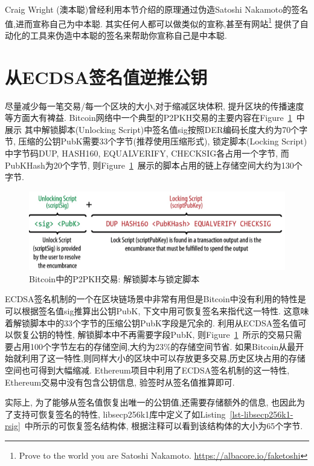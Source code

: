 \documentclass{article}
\begin{document}
Craig Wright (澳本聪)曾经利用本节介绍的原理通过伪造Satoshi Nakamoto的签名值,进而宣称自己为中本聪.
其实任何人都可以做类似的宣称,甚至有网站\footnote{
Prove to the world you are Satoshi Nakamoto. \url{https://albacore.io/faketoshi}}
提供了自动化的工具来伪造中本聪的签名来帮助你宣称自己是中本聪.

\section{从ECDSA签名值逆推公钥}

尽量减少每一笔交易/每一个区块的大小,对于缩减区块体积, 提升区块的传播速度等方面大有裨益.
Bitcoin网络中一个典型的P2PKH交易的主要内容在Figure~\ref{fig-bitcoin-p2phk}~中展示
其中解锁脚本(Unlocking Script)中签名值\textsf{sig}按照DER编码长度大约为70个字节, 
压缩的公钥\textsf{PubK}需要33个字节(推荐使用压缩形式),
锁定脚本(Locking Script)中字节码\textsf{DUP}, \textsf{HASH160}, \textsf{EQUALVERIFY}, \textsf{CHECKSIG}各占用一个字节, 
而\textsf{PubKHash}为20个字节, 则Figure~\ref{fig-bitcoin-p2phk}~展示的脚本占用的链上存储空间大约为130个字节.

\begin{figure}[h]
\centering
\includegraphics[width=\textwidth]{./bitcoin-p2pkh.png}
\caption{Bitcoin中的P2PKH交易: 解锁脚本与锁定脚本}\label{fig-bitcoin-p2phk}
\end{figure}

ECDSA签名机制的一个在区块链场景中非常有用但是Bitcoin中没有利用的特性是可以根据签名值\textsf{sig}推算出公钥\textsf{PubK},
下文中用可恢复签名来指代这一特性.
这意味着解锁脚本中的33个字节的压缩公钥\textsf{PubK}字段是冗余的.
利用从ECDSA签名值可以恢复公钥的特性, 解锁脚本中不再需要字段\textsf{PubK},
则Figure~\ref{fig-bitcoin-p2phk}~所示的交易只需要占用100个字节左右的存储空间,大约为23\%的存储空间节省.
如果Bitcoin从最开始就利用了这一特性,则同样大小的区块中可以存放更多交易,历史区块占用的存储空间也可得到大幅缩减.
Ethereum项目中利用了ECDSA签名机制的这一特性, Ethereum交易中没有包含公钥信息, 验签时从签名值推算即可.

实际上, 为了能够从签名值恢复出唯一的公钥值,还需要存储额外的信息,
也因此为了支持可恢复签名的特性, libsecp256k1库中定义了如Listing~\ref{lst-libsecp256k1-rsig}~中所示的可恢复签名结构体,
 根据注释可以看到该结构体的大小为65个字节.
\end{document}
